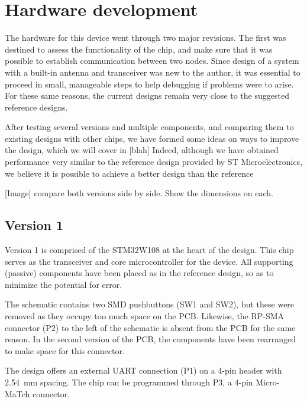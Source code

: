 \chapter{Hardware development}\label{ch:examples}

The hardware for this device went through two major revisions. The first was
destined to assess the functionality of the chip, and make sure that it was
possible to establish communication between two nodes. Since design of a system
with a built-in antenna and transceiver was new to the author, it was essential
to proceed in small, manageable steps to help debugging if problems were to
arise. For these same reasons, the current designs remain very close to the
suggested reference designs.

After testing several versions and multiple components, and comparing them to
existing designs with other chips, we have formed some ideas on ways to improve
the design, which we will cover in [blah] %
Indeed, although we have obtained performance very similar to the reference
design provided by ST Microelectronics, we believe it is possible to achieve
a better design than the reference

[Image] compare both versions side by side. Show the dimensions on each.

\section{Version 1}

Version 1 is comprised of the STM32W108 at the heart of the design. This chip
serves as the transceiver and core microcontroller for the device. All
supporting (passive) components have been placed as in the reference design, so
as to minimize the potential for error. 

The schematic contains two SMD pushbuttons (SW1 and SW2), but these were removed
as they occupy too much space on the PCB. Likewise, the RP-SMA connector (P2) to
the left of the schematic is absent from the PCB for the same reason. In the
second version of the PCB, the components have been rearranged to make space for
this connector.

The design offers an external UART connection (P1) on a 4-pin header with
\SI{2.54}{mm} spacing. The chip can be programmed through P3, a 4-pin
Micro-MaTch\textsuperscript{\texttrademark} connector.

